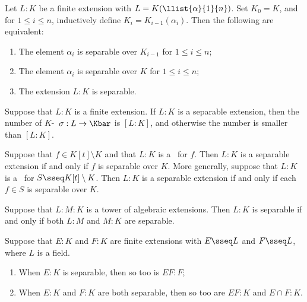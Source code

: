 \documentclass{article}
\begin{document}
  \begin{ttheorem}
    Let \( L:K \) be a finite extension with \( L=K(\llist{\alpha}{1}{n}) \). Set \( K_0=K \), and for \( 1\leq i\leq n \), inductively define \( K_i=K_{i-1}(\alpha_i) \). Then the following are equivalent:
    \begin{enumerate}[label=(\roman*)]
      \item The element \( \alpha_i \) is separable over \( K_{i-1} \) for \( 1\leq i\leq n \);
      \item The element \( \alpha_i \) is separable over \( K \) for \( 1\leq i\leq n \);
      \item The extension \( L:K \) is separable.
    \end{enumerate}
  \end{ttheorem}

  \begin{tcorollary}
    Suppose that \( L:K \) is a finite extension. If \( L:K \) is a separable extension, then the number of \( K \)-\homo~\( \sigma:L\to\Kbar \) is \( [L:K] \), and otherwise the number is smaller than \( [L:K] \).
  \end{tcorollary}

  \begin{tcorollary}
    Suppose that \( f\in K[t]\setminus K \) and that \( L:K \) is a \sfe~for \( f \). Then \( L:K \) is a separable extension if and only if \( f \) is separable over \( K \). More generally, suppose that \( L:K \) is a \sfe~for \( S\sseq K[t]\setminus K \). Then \( L:K \) is a separable extension if and only if each \( f\in S \) is separable over \( K \).
  \end{tcorollary}

  \begin{ttheorem}
    Suppose that \( L:M:K \) is a tower of algebraic extensions. Then \( L:K \) is separable if and only if both \( L:M \) and \( M:K \) are separable.
  \end{ttheorem}

  \begin{ttheorem}
    Suppose that \( E:K \) and \( F:K \) are finite extensions with \( E\sseq L \) and \( F\sseq L \), where \( L \) is a field.
    \begin{enumerate}[label=(\alph*)]
      \item When \( E:K \) is separable, then so too is \( EF:F \);
      \item When \( E:K \) and \( F:K \) are both separable, then so too are \( EF:K \) and \( E\cap F:K \).
    \end{enumerate}
  \end{ttheorem}
\end{document}
